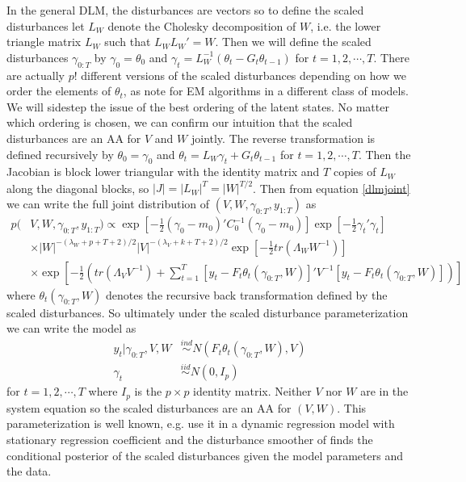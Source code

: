 \documentclass{article}
\begin{document}
In the general DLM, the disturbances are vectors so to define the scaled disturbances let $L_W$ denote the Cholesky decomposition of $W$, i.e. the lower triangle matrix $L_W$ such that $L_WL_W' =W$. Then we will define the scaled disturbances $\gamma_{0:T}$ by $\gamma_0=\theta_0$ and $\gamma_t = L_W^{-1}(\theta_t-G_t\theta_{t-1})$ for $t=1,2,\cdots,T$. There are actually $p!$ different versions of the scaled disturbances depending on how we order the elements of $\theta_t$, as  note for EM algorithms in a different class of models. We will sidestep the issue of the best ordering of the latent states. No matter which ordering is chosen, we can confirm our intuition that the scaled disturbances are an AA for $V$ and $W$ jointly. The reverse transformation is defined recursively by $\theta_0=\gamma_0$ and $\theta_t=L_W\gamma_t + G_t\theta_{t-1}$ for $t=1,2,\cdots,T$. Then the Jacobian is block lower triangular with the identity matrix and $T$ copies of $L_W$ along the diagonal blocks, so $|J| = |L_W|^T=|W|^{T/2}$. Then from equation \eqref{dlmjoint} we can write the full joint distribution of $(V,W,\gamma_{0:T},y_{1:T})$ as
 \begin{align}
  p(&V,W,\gamma_{0:T},y_{1:T}) \propto \exp\left[-\frac{1}{2}(\gamma_0-m_0)'C_0^{-1}(\gamma_0-m_0)\right] \exp\left[-\frac{1}{2}\gamma_t'\gamma_t\right] \nonumber\\
  &\times |W|^{-(\lambda_W + p + T + 2)/2} |V|^{-(\lambda_V + k + T + 2)/2} \exp\left[-\frac{1}{2}tr\left(\Lambda_WW^{-1}\right)\right]  \nonumber\\
  &\times \exp\left[-\frac{1}{2}\left(tr\left(\Lambda_VV^{-1}\right) + \sum_{t=1}^T\left[y_t-F_t\theta_t(\gamma_{0:T},W)\right]'V^{-1}\left[y_t-F_t\theta_t(\gamma_{0:T},W)\right]\right)\right] \label{dlmdistjoint}
 \end{align}
where $\theta_t(\gamma_{0:T},W)$ denotes the recursive back transformation defined by the scaled disturbances. So ultimately under the scaled disturbance parameterization we can write the model as
\begin{align}
  y_t|\gamma_{0:T},V,W & \stackrel{ind}{\sim} N\left(F_t\theta_t(\gamma_{0:T},W), V\right)\nonumber\\
  \gamma_t & \stackrel{iid}{\sim}N(0,I_p) \label{dlmdistmodel}
\end{align}
for $t=1,2,\cdots,T$ where $I_p$ is the $p\times p$ identity matrix. Neither $V$ nor $W$ are in the system equation so the scaled disturbances are an AA for $(V,W)$. This parameterization is well known, e.g.  use it in a dynamic regression model with stationary regression coefficient and the disturbance smoother of  finds the conditional posterior of the scaled disturbances given the model parameters and the data. 
\end{document}
